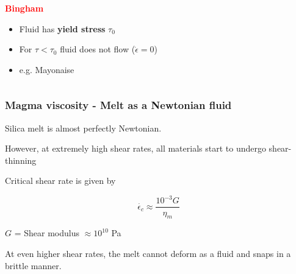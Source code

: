 \documentclass{beamer}
\begin{document}
\begin{frame}
\begin{columns}[t]
\begin{column}{0.45\paperwidth}
      \textbf{\textcolor{red}{Bingham}}
      \begin{itemize}
      \item Fluid has \textbf{yield stress} $\tau_{0}$ \\
      \item For $\tau < \tau_{0}$ fluid does not flow ($\dot{\epsilon} = 0$) \\
      \item e.g. Mayonaise
      \end{itemize}
      
\end{column}

  \end{columns}

\end{frame}
\begin{frame}
  \frametitle{Magma viscosity - Melt as a Newtonian fluid}

  Silica melt is almost perfectly Newtonian. \\

  \vspace{0.5cm}

  However, at extremely high shear rates, all materials start to undergo shear-thinning \\

  \vspace{0.5cm}

  Critical shear rate is given by

  $$ \dot{\epsilon_{c}} \approx \frac{10^{-3} G}{\eta_{m}} $$

  $G$ = Shear modulus $\approx 10^{10}$ Pa

  \vspace{0.5cm}

  At even higher shear rates, the melt cannot deform as a fluid and snaps in a brittle manner. 
\end{frame}
\end{document}
